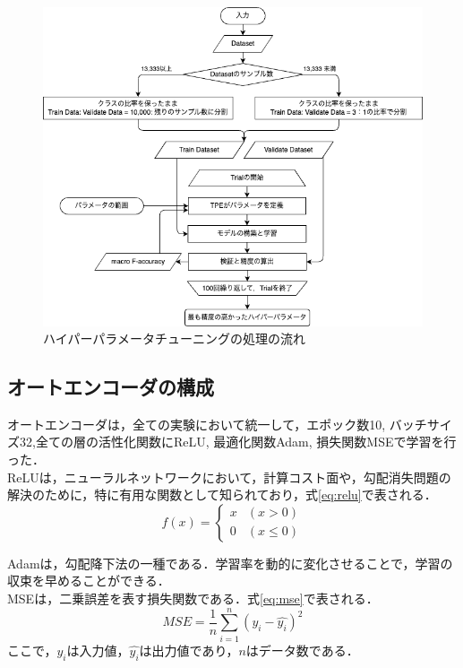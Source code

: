 \begin{figure}[htbp]
    \centering
    \includegraphics[width=15cm]{figures/optuna.png}
        \caption{ハイパーパラメータチューニングの処理の流れ}
        \label{fig:hyperparameter-tuning}
\end{figure}



\subsection{オートエンコーダの構成}\label{sec:ae}
オートエンコーダは，全ての実験において統一して，エポック数10, バッチサイズ32,全ての層の活性化関数にReLU, 最適化関数Adam, 損失関数MSEで学習を行った．\\
ReLUは，ニューラルネットワークにおいて，計算コスト面や，勾配消失問題の解決のために，特に有用な関数として知られており，式\ref{eq:relu}で表される．
\begin{equation}
    \label{eq:relu}
    f(x) = \begin{cases}
        x & (x > 0) \\
        0 & (x \leq 0)
    \end{cases}
\end{equation}

Adamは，勾配降下法の一種である．学習率を動的に変化させることで，学習の収束を早めることができる．\\
MSEは，二乗誤差を表す損失関数である．式\ref{eq:mse}で表される．
\begin{equation}
    \label{eq:mse}
    MSE = \frac{1}{n}\sum_{i=1}^{n}(y_i - \hat{y_i})^2
\end{equation}
ここで，$y_i$は入力値，$\hat{y_i}$は出力値であり，$n$はデータ数である．\\

